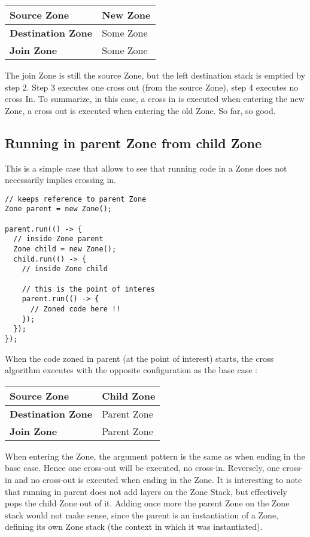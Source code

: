 \begin{tabular}{| l | l |}
\hline
\textbf{Source Zone} & New Zone \\ \hline
\textbf{Destination Zone} & Some Zone \\ \hline
\textbf{Join Zone} & Some Zone \\ \hline
\end{tabular}

The join Zone is still the source Zone, but the left destination stack is emptied by step 2. Step 3 executes one cross out (from the source Zone), step 4 executes no cross In. To summarize, in this case, a cross in is executed when entering the new Zone, a cross out is executed when entering the old Zone. So far, so good.

\subsection*{Running in parent Zone from child Zone}

This is a simple case that allows to see that running code in a Zone does not necessarily implies crossing in.

\begin{lstlisting}
// keeps reference to parent Zone
Zone parent = new Zone();

parent.run(() -> {
  // inside Zone parent
  Zone child = new Zone();
  child.run(() -> {
    // inside Zone child

    // this is the point of interes
    parent.run(() -> {
      // Zoned code here !!
    });
  });
});
\end{lstlisting}

When the code zoned in parent (at the point of interest) starts, the cross algorithm executes with the opposite configuration as the base case :

\begin{tabular}{| l | l |}
\hline
\textbf{Source Zone} & Child Zone \\ \hline
\textbf{Destination Zone} & Parent Zone \\ \hline
\textbf{Join Zone} & Parent Zone \\ \hline
\end{tabular}

When entering the Zone, the argument pattern is the same as when ending in the base case. Hence one cross-out will be executed, no cross-in. Reversely, one cross-in and no cross-out is executed when ending in the Zone.
It is interesting to note that running in parent does not add layers on the Zone Stack, but effectively pops the child Zone out of it. Adding once more the parent Zone on the Zone stack would not make sense, since the parent is an instantiation of a Zone, defining its own Zone stack (the context in which it was instantiated).


